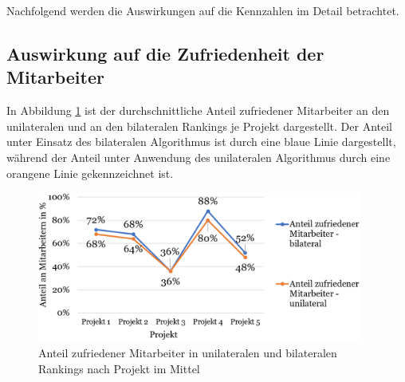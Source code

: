 Nachfolgend werden die Auswirkungen auf die Kennzahlen im Detail betrachtet.

\subsection{Auswirkung auf die Zufriedenheit der Mitarbeiter}
In Abbildung \ref{fig:ergebnisse:abb8} ist der durchschnittliche Anteil zufriedener Mitarbeiter an den unilateralen und an den bilateralen Rankings je Projekt dargestellt.
Der Anteil unter Einsatz des bilateralen Algorithmus ist durch eine blaue Linie dargestellt, während der Anteil unter Anwendung des unilateralen Algorithmus durch eine orangene Linie gekennzeichnet ist.

\begin{figure}[H]
    \centering
	\includegraphics[width=0.95\textwidth]{gfx/verhaeltnis-z-durchschnitt-projekte.png}
	\caption[Anteil zufriedener Mitarbeiter in unilateralen und bilateralen Rankings nach Projekt im Mittel]{Anteil zufriedener Mitarbeiter in unilateralen und bilateralen Rankings nach Projekt im Mittel}
	\label{fig:ergebnisse:abb8}
\end{figure}

